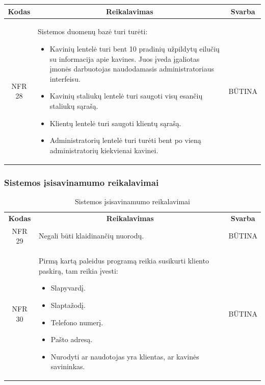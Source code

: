 \documentclass{VUMIFPSkursinis}
\begin{document}
{{{{{\begin{center}
\begin{table}[H]
\begin{tabular}{|p{2cm}|p{}|p{}|}
	\hline
		\multicolumn{1}{|c|}{{\bfseries Kodas}}&
		\multicolumn{1}{|c|}{{\bfseries Reikalavimas}}&
		\multicolumn{1}{|c|}{{\bfseries Svarba}}\\
	\hline 	
		\multicolumn{1}{|c|}{NFR 28}&
		{Sistemos duomenų bazė turi turėti:
			\begin{itemize}
				\item Kavinių lentelė turi bent 10 pradinių užpildytų eilučių su informacija apie kavines. Juos įveda įgaliotas įmonės darbuotojas naudodamasis administratoriaus interfeisu.
				\item Kavinių staliukų lentelė turi saugoti visų esančių staliukų sąrašą.
				\item Klientų lentelė turi saugoti klientų sąrašą.
				\item Administratorių lentelė turi turėti bent po vieną administratorių kiekvienai kavinei.
			\end{itemize}}&
		\multicolumn{1}{|c|}{BŪTINA}\\	
	
	\hline 	
	
	\end{tabular}
	\end{table}

\end{center}

\subsubsection{Sistemos įsisavinamumo reikalavimai}
\begin{center}
	\begin{table}[H]
	\caption{Sistemos įsisavinamumo reikalavimai}
	\begin{tabular}{|p{2cm}|p{}|p{}|}
	\hline
	    \rowcolor{lightgray}
		\multicolumn{3}{|c|}{Sistemos įsisavinamumo reikalavimai}\\
		
	\hline
		\multicolumn{1}{|c|}{{\bfseries Kodas}}&
		\multicolumn{1}{|c|}{{\bfseries Reikalavimas}}&
		\multicolumn{1}{|c|}{{\bfseries Svarba}}\\
	\hline 	
		\multicolumn{1}{|c|}{NFR 29}&
		{Negali būti klaidinančių nuorodų.}&
		\multicolumn{1}{|c|}{BŪTINA}\\	
	
	\hline 	
		\multicolumn{1}{|c|}{NFR 30}&
		{Pirmą kartą paleidus programą reikia susikurti kliento paskirą, tam reikia įvesti:
			\begin{itemize}
				\item Slapyvardį.
				\item Slaptažodį.
				\item Telefono numerį.
				\item Pašto adresą.
				\item Nurodyti ar naudotojas yra klientas, ar kavinės savininkas.
			\end{itemize}}&
		\multicolumn{1}{|c|}{BŪTINA}\\	
	

\end{tabular}
\end{table}
\end{center}}}}}}
\end{document}
